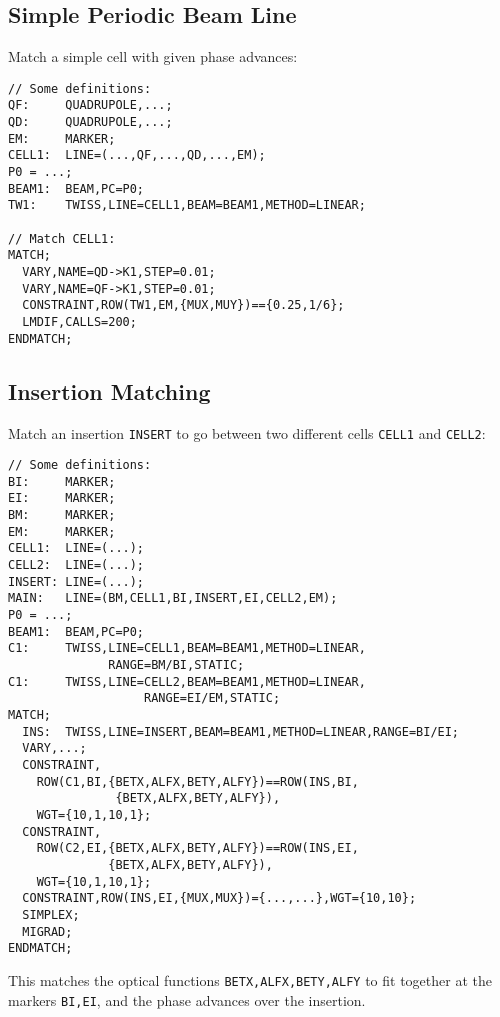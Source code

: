 \subsection{Simple Periodic Beam Line}
Match a simple cell with given phase advances:
\begin{verbatim}
// Some definitions:
QF:     QUADRUPOLE,...;
QD:     QUADRUPOLE,...;
EM:     MARKER;
CELL1:  LINE=(...,QF,...,QD,...,EM);
P0 = ...;
BEAM1:  BEAM,PC=P0;
TW1:    TWISS,LINE=CELL1,BEAM=BEAM1,METHOD=LINEAR;

// Match CELL1:
MATCH;
  VARY,NAME=QD->K1,STEP=0.01;
  VARY,NAME=QF->K1,STEP=0.01;
  CONSTRAINT,ROW(TW1,EM,{MUX,MUY})=={0.25,1/6};
  LMDIF,CALLS=200;
ENDMATCH;
\end{verbatim}

\subsection{Insertion Matching}
Match an insertion \texttt{INSERT} to go between
two different cells \texttt{CELL1} and \texttt{CELL2}:
\begin{verbatim}
// Some definitions:
BI:     MARKER;
EI:     MARKER;
BM:     MARKER;
EM:     MARKER;
CELL1:  LINE=(...);
CELL2:  LINE=(...);
INSERT: LINE=(...);
MAIN:   LINE=(BM,CELL1,BI,INSERT,EI,CELL2,EM);
P0 = ...;
BEAM1:  BEAM,PC=P0;
C1:     TWISS,LINE=CELL1,BEAM=BEAM1,METHOD=LINEAR,
		      RANGE=BM/BI,STATIC;
C1:     TWISS,LINE=CELL2,BEAM=BEAM1,METHOD=LINEAR,
	               RANGE=EI/EM,STATIC;
MATCH;
  INS:  TWISS,LINE=INSERT,BEAM=BEAM1,METHOD=LINEAR,RANGE=BI/EI;
  VARY,...;
  CONSTRAINT,
    ROW(C1,BI,{BETX,ALFX,BETY,ALFY})==ROW(INS,BI,
               {BETX,ALFX,BETY,ALFY}),
    WGT={10,1,10,1};
  CONSTRAINT,
    ROW(C2,EI,{BETX,ALFX,BETY,ALFY})==ROW(INS,EI,
              {BETX,ALFX,BETY,ALFY}),
    WGT={10,1,10,1};
  CONSTRAINT,ROW(INS,EI,{MUX,MUX})={...,...},WGT={10,10};
  SIMPLEX; 
  MIGRAD;
ENDMATCH;
\end{verbatim}
This matches the optical functions \texttt{BETX,ALFX,BETY,ALFY} to fit
together at the markers \texttt{BI,EI}, and the phase advances over
the insertion.

